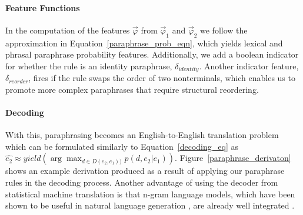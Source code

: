 \documentclass[11pt]{article}
\begin{document}
\paragraph{Feature Functions}

In the computation of the features $\vec{\varphi}$ from
$\vec{\varphi}_1$ and $\vec{\varphi}_2$ we follow the approximation in
Equation~\ref{paraphrase_prob_eqn}, which yields lexical and phrasal
paraphrase probability features. Additionally, we add a boolean
indicator for whether the rule is an identity paraphrase,
$\delta_{\mathit{identity}}$. Another indicator feature,
$\delta_{\mathit{reorder}}$, fires if the rule swaps the order of two
nonterminals, which enables us to promote more complex paraphrases
that require structural reordering.


\paragraph{Decoding}

With this, paraphrasing becomes an English-to-English translation
problem which can be formulated similarly to
Equation~\ref{decoding_eq} as $\hat{e_2} \approx yield(\arg \max_{d\in
  D(e_2,e_1))}{p(d,e_2|e_1)})$. Figure~\ref{paraphrase_derivaton}
shows an example derivation produced as a result of applying our
paraphrase rules in the decoding process. Another advantage of using
the decoder from statistical machine translation is that n-gram
language models, which have been shown to be useful in natural
language generation \cite{Langkilde1998}, are already well integrated
\cite{Huang2007}.
\end{document}
